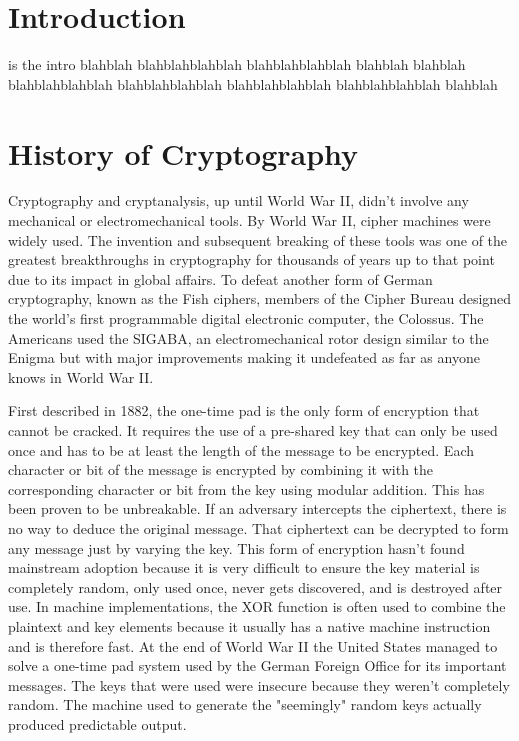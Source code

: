\documentclass[journal]{IEEEtran}
\begin{document}
\section{Introduction}
% 
% 
% 
% 
 is the intro blahblah blahblahblahblah blahblahblahblah blahblah
blahblah blahblahblahblah blahblahblahblah blahblahblahblah blahblahblahblah blahblah


\section{History of Cryptography}

Cryptography and cryptanalysis, up until World War II, didn't involve any mechanical or electromechanical tools.  By World War II, cipher machines were widely used.  The invention and subsequent breaking of these tools was one of the greatest breakthroughs in cryptography for thousands of years up to that point due to its impact in global affairs.  To defeat another form of German cryptography, known as the Fish ciphers, members of the Cipher Bureau designed the world's first programmable digital electronic computer, the Colossus.  The Americans used the SIGABA, an electromechanical rotor design similar to the Enigma but with major improvements making it undefeated as far as anyone knows in World War II.


First described in 1882, the one-time pad is the only form of encryption that cannot be cracked.  It requires the use of a pre-shared key that can only be used once and has to be at least the length of the message to be encrypted.  Each character or bit of the message is encrypted by combining it with the corresponding character or bit from the key using modular addition.  This has been proven to be unbreakable.  If an adversary intercepts the ciphertext, there is no way to deduce the original message.  That ciphertext can be decrypted to form any message just by varying the key.  This form of encryption hasn't found mainstream adoption because it is very difficult to ensure the key material is completely random, only used once, never gets discovered, and is destroyed after use.  In machine implementations, the XOR function is often used to combine the plaintext and key elements because it usually has a native machine instruction and is therefore fast.  At the end of World War II the United States managed to solve a one-time pad system used by the German Foreign Office for its important messages.  The keys that were used were insecure because they weren't completely random.  The machine used to generate the "seemingly" random keys actually produced predictable output.
\end{document}
